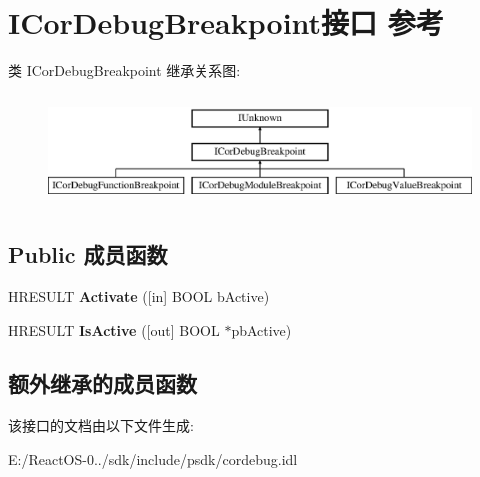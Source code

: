 \hypertarget{interface_i_cor_debug_breakpoint}{}\section{I\+Cor\+Debug\+Breakpoint接口 参考}
\label{interface_i_cor_debug_breakpoint}
类 I\+Cor\+Debug\+Breakpoint 继承关系图\+:\begin{figure}[H]
\begin{center}
\leavevmode
\includegraphics[height=2.947368cm]{interface_i_cor_debug_breakpoint}
\end{center}
\end{figure}
\subsection*{Public 成员函数}
\begin{DoxyCompactItemize}
\item 
\mbox{\label{interface_i_cor_debug_breakpoint_ab7ec36dacec4c635810a3896df209746}} 
H\+R\+E\+S\+U\+LT {\bfseries Activate} (\mbox{[}in\mbox{]} B\+O\+OL b\+Active)
\item 
\mbox{\label{interface_i_cor_debug_breakpoint_a74b528cd4de99f5f60ae2e42f48636fe}} 
H\+R\+E\+S\+U\+LT {\bfseries Is\+Active} (\mbox{[}out\mbox{]} B\+O\+OL $\ast$pb\+Active)
\end{DoxyCompactItemize}
\subsection*{额外继承的成员函数}


该接口的文档由以下文件生成\+:\begin{DoxyCompactItemize}
\item 
E\+:/\+React\+O\+S-\/0../sdk/include/psdk/cordebug.\+idl\end{DoxyCompactItemize}
